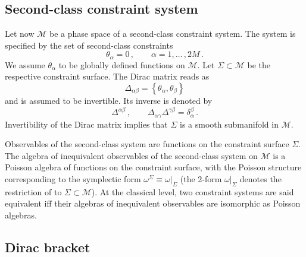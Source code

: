 \documentclass[a4paper,11pt]{amsart}
\numberwithin{thm}{section} %
\numberwithin{equation}{section} %
\numberwithin{figure}{section} %
\newcommand{\pb}[2]{\left\{{}#1{},{}#2{}\right\}}
\renewcommand{\:}{{\rm\, :\,}}
\def\manM{{\mathcal M}}
\begin{document}
\subsection{Second-class constraint system}
Let now $\manM$ be a phase space of a
second-class constraint system.  The system is specified by the set of
second-class constraints
\begin{equation}
\theta_\alpha=0\,,\qquad \alpha=1,\ldots\,,2M\,.
\label{eq:constraints}
\end{equation}
We assume $\theta_\alpha$ to be globally defined functions on $\manM$.
Let $\Sigma \subset \manM$ be the respective constraint
surface.  The Dirac matrix reads as
\begin{equation}
  \label{eq:dirac-matrix}
\Delta_{\alpha \beta}=\pb{\theta_\alpha}{\theta_\beta}
\end{equation}
and is assumed to be invertible. Its inverse is denoted by
$$
\Delta^{\alpha \beta}\,,\qquad
 \Delta_{\alpha \gamma}\Delta^{\gamma \beta}=\delta^\beta_\alpha\,.
$$
Invertibility of the Dirac matrix implies that
$\Sigma$ is a smooth submanifold in $\manM$.


Observables of the second-class system are functions on the
constraint surface $\Sigma$.  The algebra of inequivalent observables
of the second-class system on $\manM$ is a Poisson algebra of
functions on the constraint surface, with the Poisson structure
corresponding to the symplectic form
$\omega^\Sigma\equiv\omega{\big|}_{\Sigma}$
(the 2-form $\omega{\big|}_{\Sigma}$ denotes the restriction of
to $\Sigma\subset\manM$).  At the classical level, two constraint
systems are said equivalent iff their algebras of inequivalent
observables are isomorphic as Poisson algebras.




\subsection{Dirac bracket}
\end{document}
